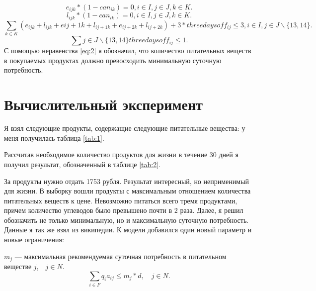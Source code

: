 \documentclass[]{article}
\begin{document}
\begin{equation}
  e_{ijk}*(1-can_{ik}) = 0, i \in I, j \in J, k \in K.
\end{equation}
\begin{equation}
  l_{ijk}*(1-can_{ik}) = 0, i \in I, j \in J, k \in K.
\end{equation}
\begin{equation}
  \sum_{k \in K} (e_{ijk}+l_{ijk}+e{ij+1k}+l_{ij+1k}+e_{ij+2k}+l_{ij+2k})
        + 3*threedaysoff_{ij} \leq 3, i \in I, j \in J\backslash\{13,14\}.
\end{equation}
\begin{equation}
  \sum {j \in  J\backslash\{13,14\}} threedaysoff_{ij} \leq 1.
\end{equation}
С помощью неравенства \eqref{eq:2} я обозначил, что количество питательных
веществ в покупаемых продуктах должно превосходить минимальную суточную
потребность.

\section{Вычислительный эксперимент}
Я взял следующие продукты, содержащие следующие питательные вещества:
у меня получилась таблица \ref{tab:1}.



Рассчитав необходимое количество продуктов для жизни в течение 30 дней я получил результат, обозначенный в таблице \ref{tab:2}.


За продукты нужно отдать 1753 рубля. Результат интересный, но неприменимый для жизни.  В выборку вошли продукты с
максимальным отношением количества питательных веществ к цене. Невозможно питаться всего тремя продуктами,
причем количество углеводов было превышено почти в 2 раза. Далее, я решил обозначить не только минимальную,
но и максимальную суточную потребность. Данные я так же взял из википедии. К модели добавился один новый параметр и
новые ограничения:

\par\noindent
$m_j$ --- максимальная рекомендуемая суточная потребность в питательном веществе $j$,$\quad j\in N$.
\begin{equation}
	\sum_{i\in F}q_ia_{ij} \leq m_j*d,\quad j\in N.
\end{equation}
\end{document}
